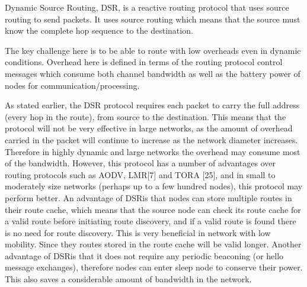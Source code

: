 \documentclass[letterpaper, 10 pt, conference]{ieeeconf}  %
\begin{document}
Dynamic  Source Routing, DSR, is a reactive routing protocol that uses source routing to send packets. It  uses  source  routing  which  means  that  the  source  must  know  the  complete  hop sequence to the destination.






The key challenge here is to be able to route with low overheads even in dynamic conditions. Overhead here is defined in terms of the routing protocol control messages which consume both channel bandwidth as well as the battery power of nodes for communication/processing.


As stated earlier, the DSR protocol requires
each packet to carry the full address (every hop in
the route), from source to the destination. This
means that the protocol will not be very effective in
large networks, as the amount of overhead carried
in the packet will continue to increase as the network
diameter increases. Therefore in highly dynamic
and large networks the overhead may
consume most of the bandwidth. However, this
protocol has a number of advantages over routing
protocols such as AODV, LMR[7] and TORA
[25], and in small to moderately size networks
(perhaps up to a few hundred nodes), this protocol
may perform better. An advantage of DSRis that
nodes can store multiple routes in their route
cache, which means that the source node can check
its route cache for a valid route before initiating
route discovery, and if a valid route is found there
is no need for route discovery. This is very beneficial
in network with low mobility. Since they
routes stored in the route cache will be valid
longer. Another advantage of DSRis that it does
not require any periodic beaconing (or hello message
exchanges), therefore nodes can enter sleep
node to conserve their power. This also saves a
considerable amount of bandwidth in the network.
\end{document}
